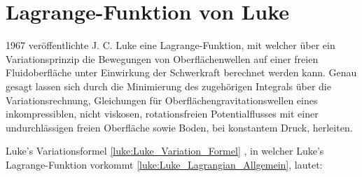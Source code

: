 %
%
%
%

\section{Lagrange-Funktion von Luke\label{luke:section:Luke_Lagrangian}}

1967 veröffentlichte J. C. Luke \cite{luke:Luke1967} eine Lagrange-Funktion, mit welcher über ein Variationsprinzip die Bewegungen von Oberflächenwellen auf einer freien Fluidoberfläche unter Einwirkung der Schwerkraft berechnet werden kann.
Genau gesagt lassen sich durch die Minimierung des zugehörigen Integrals über die Variationsrechnung, Gleichungen für Oberflächengravitationswellen eines inkompressiblen, nicht viskosen, rotationsfreien Potentialflusses mit einer undurchlässigen freien Oberfläche sowie Boden, bei konstantem Druck, herleiten.

Luke’s Variationsformel \eqref{luke:Luke_Variation_Formel} , in welcher Luke’s Lagrange-Funktion vorkommt \eqref{luke:Luke_Lagrangian_Allgemein}, lautet:


